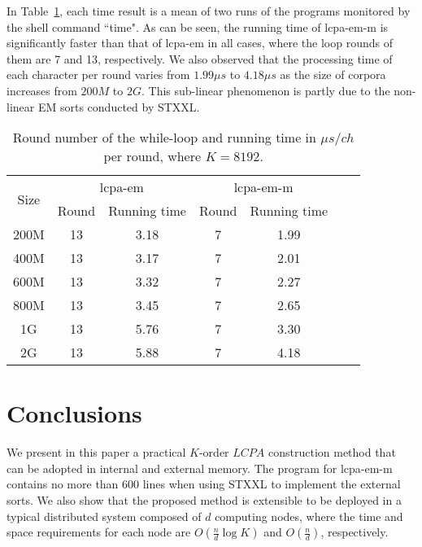 \documentclass{llncs}
\begin{document}
In Table~\ref{tbl:exp:result}, each time result is a mean of two runs of the programs monitored by the shell command ``time". As can be seen, the running time of {lcpa-em-m} is significantly faster than that of {lcpa-em} in all cases, where the loop rounds of them are 7 and 13, respectively. We also observed that the processing time of each character per round varies from $1.99\mu s$ to $4.18\mu s$ as the size of corpora increases from $200M$ to $2G$. This sub-linear phenomenon is partly due to the non-linear {EM} sorts conducted by {STXXL}.

\begin{table}
\centering
\label{tbl:exp:result}
\caption{\label{tbl:exp:result} Round number of the while-loop and running time in $\mu s/ch$ per round, where $K=8192$.}
\begin{tabular}{|c|c|c|c|c|c|c|}
\hline
\multirow{2}{*}{Size} &
\multicolumn{2}{c|}{lcpa-em} &
\multicolumn{2}{c|}{lcpa-em-m} \\
\cline{2-5}
 & Round & Running time & Round & Running time\\
\hline
200M & 13 & 3.18 & 7 & 1.99\\
\hline
400M & 13 & 3.17 & 7 & 2.01\\
\hline
600M & 13 & 3.32 & 7 & 2.27\\
\hline
800M & 13 & 3.45 & 7 & 2.65\\
\hline
1G & 13 & 5.76 & 7 & 3.30\\
\hline
2G & 13 & 5.88 & 7 & 4.18\\
\hline
\end{tabular}
\end{table}

\section{Conclusions}\label{sec:conclusion}

We present in this paper a practical $K$-order $LCPA$ construction method that can be adopted in internal and external memory. The program for {lcpa-em-m} contains no more than 600 lines when using {STXXL} to implement the external sorts. We also show that the proposed method is extensible to be deployed in a typical distributed system composed of $d$ computing nodes, where the time and space requirements for each node are $O(\frac{n}{d}\log K)$ and $O(\frac{n}{d})$, respectively.



\end{document}
